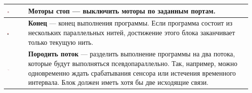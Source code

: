 \documentclass[a4paper,12pt,twoside]{article}
\begin{document}
\begin{center}
\begin{tabular}{m{} | m{}}
    {\vspace{10pt}\includegraphics[width=0.15\textwidth]{MotorStop.png}}     & \textbf{Моторы стоп} --- выключить моторы по заданным портам. \\ \hline
    {\vspace{10pt}\includegraphics[width=0.10\textwidth]{End.png}}           & \textbf{Конец} --- конец выполнения программы. Если программа состоит из нескольких параллельных нитей, достижение этого блока заканчивает только текущую нить. \\ \hline
    {\vspace{10pt}\includegraphics[width=0.15\textwidth]{Fork.png}}          & \textbf{Породить поток} --- разделить выполнение программы на два потока, которые будут выполняться псевдопараллельно. Так, например, можно одновременно ждать срабатывания сенсора или истечения временного интервала. Блок должен иметь хотя бы две исходящие связи. \\ \hline
	\end{tabular}
\end{center}
    
\end{document}
